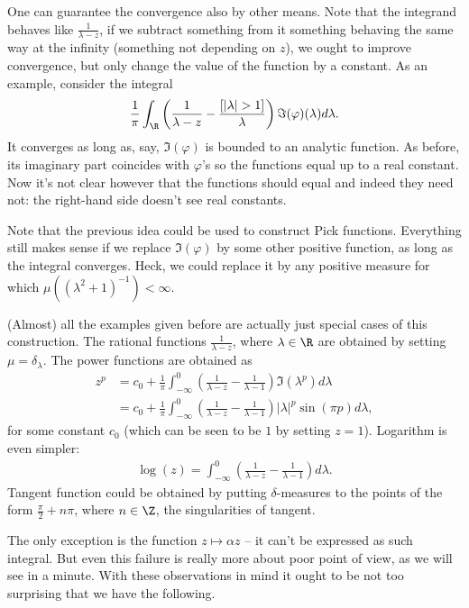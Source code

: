 One can guarantee the convergence also by other means. Note that the integrand behaves like $\frac{1}{\lambda - z}$, if we subtract something from it something behaving the same way at the infinity (something not depending on $z$), we ought to improve convergence, but only change the value of the function by a constant. As an example, consider the integral
\begin{align*}
	\frac{1}{\pi}\int_{\R} \left(\frac{1}{\lambda - z} - \frac{[|\lambda| > 1]}{\lambda} \right) \Im(\varphi)(\lambda)d \lambda.
\end{align*}
It converges as long as, say, $ \Im(\varphi)$ is bounded to an analytic function. As before, its imaginary part coincides with $\varphi$'s so the functions equal up to a real constant. Now it's not clear however that the functions should equal and indeed they need not: the right-hand side doesn't see real constants.

Note that the previous idea could be used to construct Pick functions. Everything still makes sense if we replace $\Im(\varphi)$ by some other positive function, as long as the integral converges. Heck, we could replace it by any positive measure for which $\mu((\lambda^2 + 1)^{-1}) < \infty$.

(Almost) all the examples given before are actually just special cases of this construction. The rational functions $\frac{1}{\lambda - z}$, where $\lambda \in \R$ are obtained by setting $\mu = \delta_{\lambda}$. The power functions are obtained as
\begin{align*}
	z^{p} &= c_{0} + \frac{1}{\pi}\int_{-\infty}^{0} \left(\frac{1}{\lambda - z} - \frac{1}{\lambda - 1}\right) \Im(\lambda^{p}) d \lambda \\
	&= c_{0} + \frac{1}{\pi}\int_{-\infty}^{0} \left(\frac{1}{\lambda - z} - \frac{1}{\lambda - 1}\right) |\lambda|^{p} \sin(\pi p) d \lambda,
\end{align*}
for some constant $c_{0}$ (which can be seen to be $1$ by setting $z = 1$). Logarithm is even simpler:
\begin{align*}
	\log(z) = \int_{-\infty}^{0} \left(\frac{1}{\lambda - z} - \frac{1}{\lambda - 1}\right) d \lambda.
\end{align*}
Tangent function could be obtained by putting $\delta$-measures to the points of the form $\frac{\pi}{2} + n \pi$, where $n \in \Z$, the singularities of tangent.

The only exception is the function $z \mapsto \alpha z$ -- it can't be expressed as such integral. But even this failure is really more about poor point of view, as we will see in a minute. With these observations in mind it ought to be not too surprising that we have the following.

